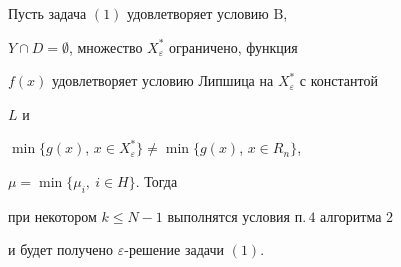 \begin{thm}


Пусть задача $(1)$ удовлетворяет условию $\mathrm B$, 


$Y\cap D=\emptyset$, множество $X_{\varepsilon}^*$ ограничено, функция


$f(x)$ удовлетворяет условию Липшица на $X_{\varepsilon}^*$ с константой


$L$ и 


$\min\{g(x)$, $x\in X_{\varepsilon}^*\}\ne\min\{g(x)$, $x\in R_n\}$,


$\mu=\min\{\mu_i,\ i\in H\}$. Тогда


при некотором $k\le N-1$ выполнятся условия п.\,$4$ алгоритма $2$ 


и будет получено $\varepsilon$-решение задачи $(1)$.


\end{thm}





